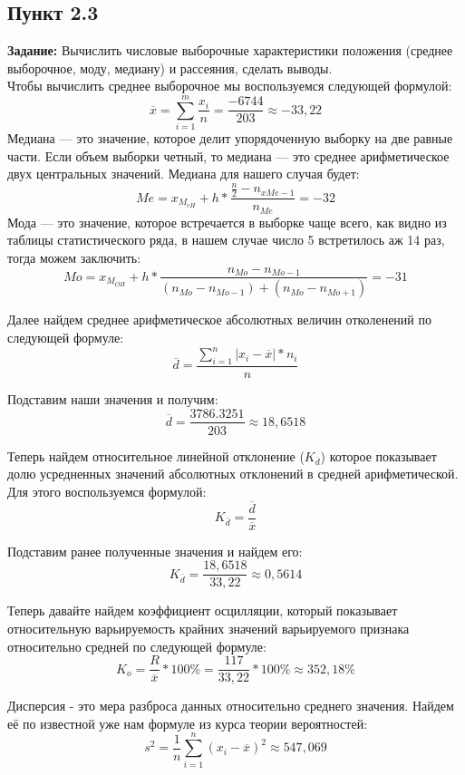 \documentclass[12pt]{article}
\begin{document}
\subsection*{Пункт 2.3}
\textbf{Задание:} Вычислить числовые выборочные характеристики положения (среднее выборочное, моду, медиану) и рассеяния, сделать выводы.\\
\vspace{5mm}
Чтобы вычислить среднее выборочное мы воспользуемся следующей формулой:\\
$$\overline{x} = \sum_{i=1} ^ m \frac{x_i}{n} = \frac{-6744}{203} \approx -33,22 $$
\vspace{5mm}
Медиана — это значение, которое делит упорядоченную выборку на две равные части. Если объем выборки четный, то медиана — это среднее арифметическое двух центральных значений. Медиана для нашего случая будет:\\
$$Me = x_{M_{eH}} + h * \frac{\frac{n}{2}-n_{xMe-1}}{n_{Me}} = -32$$
Мода — это значение, которое встречается в выборке чаще всего, как видно из таблицы статистического ряда, в нашем случае число 5 встретилось аж 14 раз, тогда можем заключить:\\
$$Mo = x_{M_{OH}} + h * \frac{n_{Mo} - n_{Mo-1}}{(n_{Mo}-n_{Mo-1})+(n_{Mo}-n_{Mo+1})} = -31$$

Далее найдем среднее арифметическое абсолютных величин отколенений по следующей формуле:
$$ \overline{d} = \frac{\sum_{i=1}^n |x_i - \overline{x}| * n_i}{n} $$

Подставим наши значения и получим:
$$ \overline{d} = \frac{3786.3251}{203} \approx 18,6518 $$

Теперь найдем относительное линейной отклонение ($K_{\overline{d}}$) которое показывает долю усредненных значений абсолютных отклонений в средней арифметической.\\
Для этого воспользуемся формулой:
$$ K_{\overline{d}} = \frac{\overline{d}}{\overline{x}} $$

Подставим ранее полученные значения и найдем его:
$$ K_{\overline{d}} = \frac{18,6518}{33,22} \approx 0,5614 $$

Теперь давайте найдем коэффициент осцилляции, который показывает относительную варьируемость крайних значений варьируемого признака относительно средней по следующей формуле:
$$ K_o = \frac{R}{\overline{x}} * 100\% = \frac{117}{33,22} * 100\% \approx 352,18\% $$

Дисперсия - это мера разброса данных относительно среднего значения. Найдем её по известной уже нам формуле из курса теории вероятностей:\\
$$ s^2 = \frac{1}{n} \sum_{i=1} ^n {(x_i - \overline{x})}^2 \approx 547,069 $$
\end{document}
